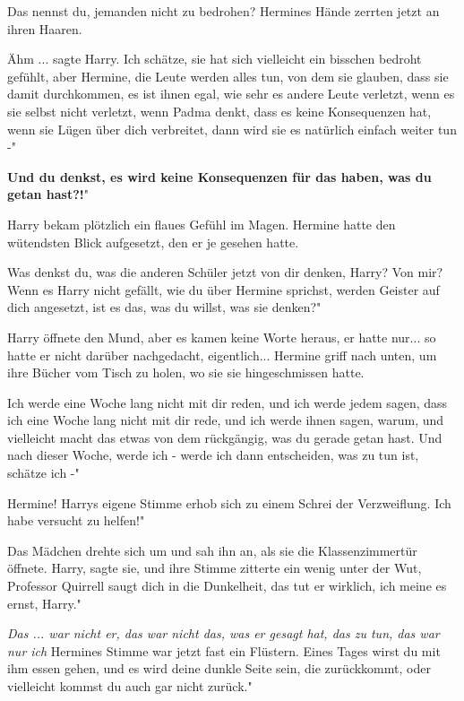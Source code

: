 \glqq{}Das nennst du, jemanden nicht zu bedrohen?\grqq{} Hermines Hände zerrten
jetzt an ihren Haaren.

\glqq{}Ähm ...\grqq{} sagte Harry. \glqq{}Ich schätze, sie hat sich vielleicht ein
bisschen bedroht gefühlt, aber Hermine, die Leute werden alles tun, von dem sie
glauben, dass sie damit durchkommen, es ist ihnen egal, wie sehr es andere Leute
verletzt, wenn es sie selbst nicht verletzt, wenn Padma denkt, dass es keine
Konsequenzen hat, wenn sie Lügen über dich verbreitet, dann wird sie es
natürlich einfach weiter tun -"

\glqq{}\textbf{Und du denkst, es wird keine Konsequenzen für das haben, was du
getan hast?!}"

Harry bekam plötzlich ein flaues Gefühl im Magen. Hermine hatte den wütendsten
Blick aufgesetzt, den er je gesehen hatte.

\glqq{}Was denkst du, was die anderen Schüler jetzt von dir denken, Harry? Von
mir? Wenn es Harry nicht gefällt, wie du über Hermine sprichst, werden Geister
auf dich angesetzt, ist es das, was du willst, was sie denken?"

Harry öffnete den Mund, aber es kamen keine Worte heraus, er hatte nur... so
hatte er nicht darüber nachgedacht, eigentlich... Hermine griff nach unten, um
ihre Bücher vom Tisch zu holen, wo sie sie hingeschmissen hatte.

\glqq{}Ich werde eine Woche lang nicht mit dir reden, und ich werde jedem sagen,
dass ich eine Woche lang nicht mit dir rede, und ich werde ihnen sagen, warum,
und vielleicht macht das etwas von dem rückgängig, was du gerade getan hast. Und
nach dieser Woche, werde ich - werde ich dann entscheiden, was zu tun ist,
schätze ich -"

\glqq{}Hermine!\grqq{} Harrys eigene Stimme erhob sich zu einem Schrei der
Verzweiflung. \glqq{}Ich habe versucht zu helfen!"

Das Mädchen drehte sich um und sah ihn an, als sie die Klassenzimmertür öffnete.
\glqq{}Harry\grqq{}, sagte sie, und ihre Stimme zitterte ein wenig unter der Wut,
\glqq{}Professor Quirrell saugt dich in die Dunkelheit, das tut er wirklich, ich
meine es ernst, Harry."

\emph{Das ... war nicht er, das war nicht das, was er gesagt hat, das zu tun,
das war nur ich}
Hermines Stimme war jetzt fast ein Flüstern. \glqq{}Eines Tages wirst du mit ihm
essen gehen, und es wird deine dunkle Seite sein, die zurückkommt, oder
vielleicht kommst du auch gar nicht zurück."


